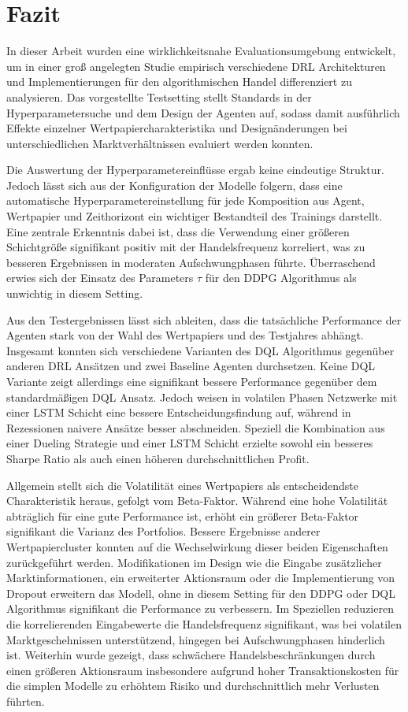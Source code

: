 \chapter{Fazit}
\label{ch:fazit}

In dieser Arbeit wurden eine wirklichkeitsnahe Evaluationsumgebung entwickelt, um in einer groß angelegten Studie empirisch verschiedene \acs{DRL} Architekturen und Implementierungen für den algorithmischen Handel differenziert zu analysieren.
Das vorgestellte Testsetting stellt Standards in der Hyperparametersuche und dem Design der Agenten auf, 
sodass damit ausführlich Effekte einzelner Wertpapiercharakteristika und Designänderungen bei unterschiedlichen Marktverhältnissen evaluiert werden konnten.

Die Auswertung der Hyperparametereinflüsse ergab keine eindeutige Struktur.
Jedoch lässt sich aus der Konfiguration der Modelle folgern, dass eine automatische Hyperparametereinstellung für jede Komposition aus Agent, Wertpapier und Zeithorizont ein wichtiger Bestandteil des Trainings darstellt.
Eine zentrale Erkenntnis dabei ist, dass die Verwendung einer größeren Schichtgröße signifikant positiv mit der Handelsfrequenz korreliert, was zu besseren Ergebnissen in moderaten Aufschwungphasen führte.
Überraschend erwies sich der Einsatz des Parameters $\tau$ für den \acs{DDPG} Algorithmus als unwichtig in diesem Setting.

Aus den Testergebnissen lässt sich ableiten, dass die tatsächliche Performance der Agenten stark von der Wahl des Wertpapiers und des Testjahres abhängt.
Insgesamt konnten sich verschiedene Varianten des \acs{DQL} Algorithmus gegenüber anderen \acs{DRL} Ansätzen und zwei Baseline Agenten durchsetzen.
Keine \acs{DQL} Variante zeigt allerdings eine signifikant bessere Performance gegenüber dem standardmäßigen \acs{DQL} Ansatz. Jedoch weisen in volatilen Phasen Netzwerke mit einer \acs{LSTM} Schicht eine bessere Entscheidungsfindung auf, während in Rezessionen naivere Ansätze besser abschneiden.
Speziell die Kombination aus einer Dueling Strategie und einer \acs{LSTM} Schicht erzielte sowohl ein besseres Sharpe Ratio als auch einen höheren durchschnittlichen Profit. 

Allgemein stellt sich die Volatilität eines Wertpapiers als entscheidendste Charakteristik heraus, gefolgt vom Beta-Faktor.
Während eine hohe Volatilität abträglich für eine gute Performance ist, erhöht ein größerer Beta-Faktor signifikant die Varianz des Portfolios.
Bessere Ergebnisse anderer Wertpapiercluster konnten auf die Wechselwirkung dieser beiden Eigenschaften zurückgeführt werden.
Modifikationen im Design wie die Eingabe zusätzlicher Marktinformationen, ein erweiterter Aktionsraum oder die Implementierung von Dropout erweitern das Modell, ohne in diesem Setting für den \acs{DDPG} oder \acs{DQL} Algorithmus signifikant die Performance zu verbessern.
Im Speziellen reduzieren die korrelierenden Eingabewerte die Handelsfrequenz signifikant, was bei volatilen Marktgeschehnissen unterstützend, hingegen bei Aufschwungphasen hinderlich ist.
Weiterhin wurde gezeigt, dass schwächere Handelsbeschränkungen durch einen größeren Aktionsraum insbesondere aufgrund hoher Transaktionskosten für die simplen Modelle zu erhöhtem Risiko und durchschnittlich mehr Verlusten führten.

